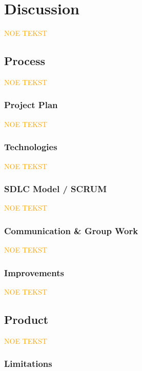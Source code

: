 \chapter{Discussion}

\textcolor{orange}{NOE TEKST}

\section{Process}

\textcolor{orange}{NOE TEKST}

\subsection{Project Plan}

\textcolor{orange}{NOE TEKST}

\subsection{Technologies}

\textcolor{orange}{NOE TEKST}

\subsection{SDLC Model / SCRUM}

\textcolor{orange}{NOE TEKST}

\subsection{Communication \& Group Work}

\textcolor{orange}{NOE TEKST}

\subsection{Improvements}

\textcolor{orange}{NOE TEKST}

\section{Product}

\textcolor{orange}{NOE TEKST}

\subsection{Limitations}

